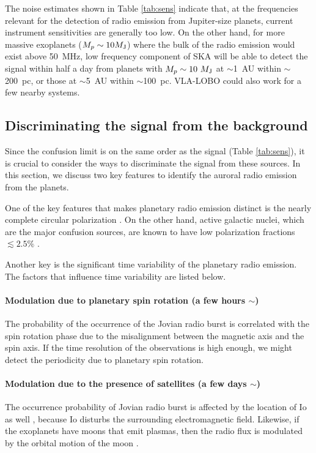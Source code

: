 \documentclass[iop,numberedappendix,apj,twocolappendix,]{emulateapj}
\begin{document}
The noise estimates shown in Table \ref{tab:sens} indicate that, at the frequencies relevant for the detection of radio emission from Jupiter-size planets, current instrument sensitivities are generally too low.
On the other hand, for more massive exoplanets ($M_p\sim 10 M_{\rm J}$) where the bulk of the radio emission would exist above 50~MHz, low frequency component of SKA will be able to detect the signal within half a day from planets with $M_p \sim 10~M_{\rm J}$ at $\sim$1~AU within $\sim $200~pc, or those at $\sim$5~AU within $\sim $100~pc. 
VLA-LOBO could also work for a few nearby systems. 




\subsection{Discriminating the signal from the background}
\label{ss:timevariability}


Since the confusion limit is on the same order as the signal (Table \ref{tab:sens}), it is crucial to consider the ways to discriminate the signal from these sources. 
In this section, we discuss two key features to identify the auroral radio emission from the planets. 

One of the key features that makes planetary radio emission distinct is the nearly  complete circular polarization \citep[e.g.][and reference therein]{dessler1983}. 
On the other hand, active galactic nuclei, which are the major confusion sources, are known to have low polarization fractions $\lesssim2.5\%$ \citep{Stil2014}. 

Another key is the significant time variability of the planetary radio emission. 
The factors that influence time variability are listed below. 

\paragraph{Modulation due to planetary spin rotation (a few hours $\sim $)}
The probability of the occurrence of the Jovian radio burst is correlated with the spin rotation phase \citep[e.g.][]{dessler1983} due to the misalignment between the magnetic axis and the spin axis. If the time resolution of the observations is high enough, we might detect the periodicity due to planetary spin rotation. 
%
\paragraph{Modulation due to the presence of satellites (a few days $\sim $)}
The occurrence probability of Jovian radio burst is affected by the location of Io as well \citep{dessler1983}, because Io disturbs the surrounding electromagnetic field. 
Likewise, if the exoplanets have moons that emit plasmas, then the radio flux is  modulated by the orbital motion of the moon \citep[see e.g.,][]{noyola2014}. 
\end{document}
